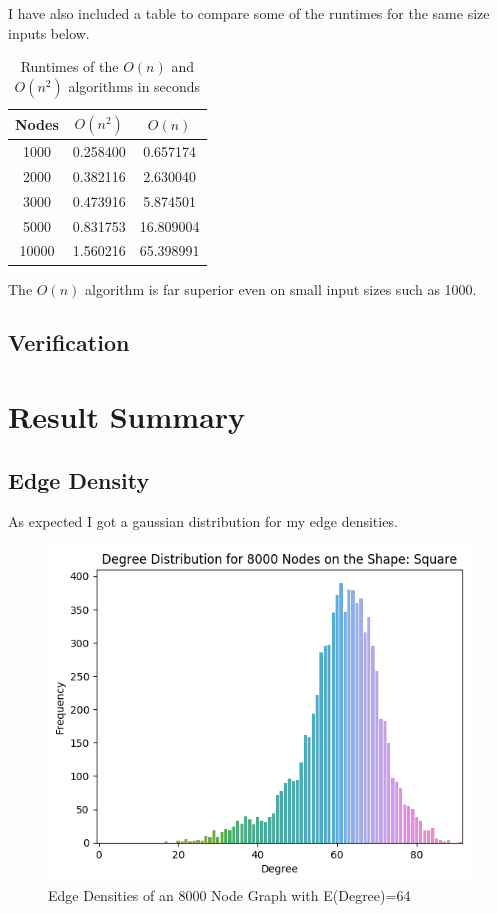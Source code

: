\documentclass{article}
\begin{document}
	  I have also included a table to compare some of the runtimes for the same size inputs below.

	  \begin{center}
	  \begin{table}[H]
		\begin{tabular}{ |c|c|c| }
			\hline
			Nodes & $O(n^2)$ & $O(n)$ \\
			\hline
      1000 & 0.258400 & 0.657174 \\
      \hline
      2000 & 0.382116 & 2.630040 \\
      \hline
      3000 & 0.473916 & 5.874501 \\
      \hline
      5000 & 0.831753 & 16.809004 \\
      \hline
      10000 & 1.560216 & 65.398991 \\
			\hline
		\end{tabular}
		\caption{Runtimes of the $O(n)$ and $O(n^2)$ algorithms in seconds}
	  \end{table}
	  \end{center}

	  The $O(n)$ algorithm is far superior even on small input sizes such as 1000.

	\subsection{Verification}

\section{Result Summary}
  \subsection{Edge Density}
  As expected I got a gaussian distribution for my edge densities.
  \begin{figure}[H]
  \centering
  \includegraphics[width=1 \textwidth]{square/edge_density/8000_64.png}
  \caption{Edge Densities of an 8000 Node Graph with E(Degree)=64}
  \end{figure}
\end{document}
